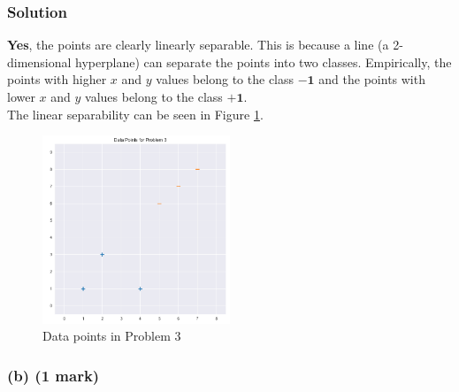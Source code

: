 \documentclass[12pt]{article}
\begin{document}
    \subsubsection*{Solution}
    \textbf{Yes}, the points are clearly linearly separable. This is because a line
    (a 2-dimensional hyperplane) can separate the points into two classes. Empirically,
    the points with higher $x$ and $y$ values belong to the class $\mathbf{-1}$ and the points
    with lower $x$ and $y$ values belong to the class $\mathbf{+1}$. \\
    The linear separability can be seen in Figure \ref{fig:prob3}.
    \begin{figure}[htbp]
        \centering
        \includegraphics[width=0.5\textwidth]{../Assets/points.png}
        \caption{Data points in Problem 3}
        \label{fig:prob3}
    \end{figure}

    \subsubsection*{(b) (1 mark)}
\end{document}
